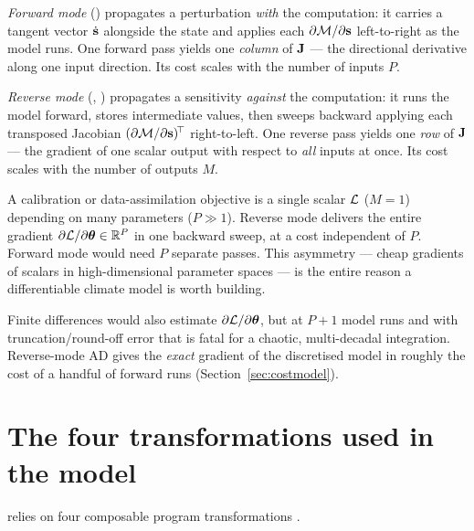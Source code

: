 \emph{Forward mode} () propagates a perturbation \emph{with} the computation: it
carries a tangent vector $\dot{\mathbf{s}}$ alongside the state and applies each
$\partial\mathcal{M}/\partial\mathbf{s}$ left-to-right as the model runs. One forward pass yields one
\emph{column} of $\mathbf{J}$ --- the directional derivative along one input direction. Its cost scales
with the number of inputs $P$.

\emph{Reverse mode} (, ) propagates a sensitivity \emph{against} the
computation: it runs the model forward, stores intermediate values, then sweeps backward applying
each transposed Jacobian $(\partial\mathcal{M}/\partial\mathbf{s})^{\!\top}$ right-to-left. One reverse pass
yields one \emph{row} of $\mathbf{J}$ --- the gradient of one scalar output with respect to \emph{all}
inputs at once. Its cost scales with the number of outputs $M$.

\begin{proposition}
A calibration or data-assimilation objective is a single scalar $\mathcal{L}$ ($M=1$) depending on many
parameters ($P\gg1$). Reverse mode delivers the entire gradient $\partial\mathcal{L}/\partial\boldsymbol{\theta}\in
\mathbb{R}^{P}$ in one backward sweep, at a cost independent of $P$. Forward mode would need $P$
separate passes. This asymmetry --- cheap gradients of scalars in high-dimensional parameter
spaces --- is the entire reason a differentiable climate model is worth building.
\end{proposition}

\begin{remark}
Finite differences would also estimate $\partial\mathcal{L}/\partial\boldsymbol{\theta}$, but at $P{+}1$ model runs
and with truncation/round-off error that is fatal for a chaotic, multi-decadal integration.
Reverse-mode AD gives the \emph{exact} gradient of the discretised model in roughly the cost of a
handful of forward runs (Section~\ref{sec:costmodel}).
\end{remark}

\section{The four \jax{} transformations used in the model}

\model{} relies on four composable program transformations \citep{jax2018,kochkov2024neuralgcm}.

